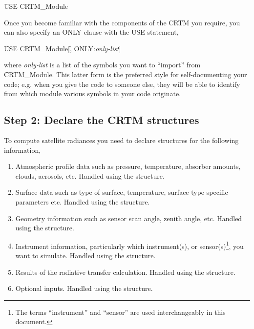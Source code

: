 \qquad\f{USE CRTM\_Module}

Once you become familiar with the components of the CRTM you require, you can also specify an \f{ONLY} clause with the \f{USE} statement,

\qquad\f{USE CRTM\_Module}[\f{, ONLY:}\textit{only-list}]

where \textit{only-list} is a list of the symbols you want to ``import'' from \f{CRTM\_Module}. This latter form is the preferred style for self-documenting your code; e.g. when you give the code to someone else, they will be able to identify from which module various symbols in your code originate.


\subsection{Step 2: Declare the CRTM structures}
\label{sec:declare_step}
To compute satellite radiances you need to declare structures for the following information,\vspace{-2ex}
\begin{enumerate}
  \item Atmospheric profile data such as pressure, temperature, absorber amounts, clouds, aerosols, etc. Handled using the \hyperref[sec:atmosphere_structure]{\Atmosphere} structure.
  \item Surface data such as type of surface, temperature, surface type specific parameters etc. Handled using the \hyperref[sec:surface_structure]{\Surface} structure.
  \item Geometry information such as sensor scan angle, zenith angle, etc. Handled using the \hyperref[sec:geometryinfo_structure]{\GeometryInfo} structure.
  \item Instrument information, particularly which instrument(s), or sensor(s)\footnote{The terms ``instrument'' and ``sensor'' are used interchangeably in this document.}, you want to simulate. Handled using the \hyperref[sec:channelinfo_structure]{\ChannelInfo} structure.
  \item Results of the radiative transfer calculation. Handled using the \hyperref[sec:rtsolution_structure]{\RTSolution} structure.
  \item Optional inputs. Handled using the \hyperref[sec:options_structure]{\Options} structure.
\end{enumerate}


